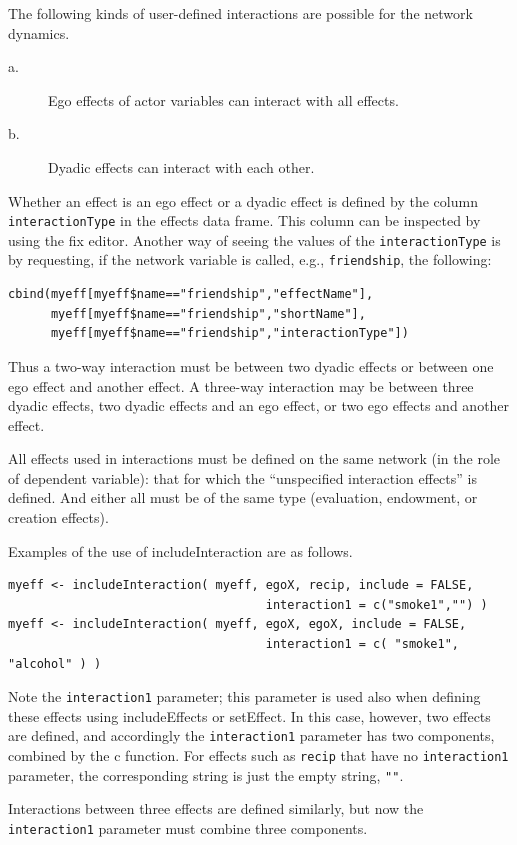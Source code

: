 \documentclass[a4paper,fleqn,11pt]{article}
\newcommand{\+}{\, + \,}
\newcommand{\sfn}[1]{\textsf{#1}}
\begin{document}
{The following kinds of user-defined interactions are possible
for the network dynamics.
\begin{description}
\item[a.]
  Ego effects of actor variables can interact with all effects.
  \item[b.] Dyadic effects can interact with each other.
\end{description}
Whether an effect is an ego effect or a dyadic effect is defined by
the column \texttt{interactionType} in the effects data frame.
This column can be inspected by using the \sfn{fix} editor.
Another way of seeing
the values of the \texttt{interactionType} is by requesting,
if the network variable is called, e.g., \texttt{friendship}, the following:
\begin{verbatim}
cbind(myeff[myeff$name=="friendship","effectName"],
      myeff[myeff$name=="friendship","shortName"],
      myeff[myeff$name=="friendship","interactionType"])
\end{verbatim}
Thus a two-way interaction must be between two dyadic effects or between one
ego effect and another effect. A three-way interaction may be between three
dyadic effects, two dyadic effects and an ego effect, or two ego effects and
another effect.

All effects used in interactions must be defined on the same network
(in the role of dependent variable): that for
which the ``unspecified
interaction effects'' is defined.  And either all must be
of the same type (evaluation, endowment, or creation effects).

Examples of the use of \sfn{includeInteraction} are as follows.
\begin{verbatim}
myeff <- includeInteraction( myeff, egoX, recip, include = FALSE,
                                    interaction1 = c("smoke1","") )
myeff <- includeInteraction( myeff, egoX, egoX, include = FALSE,
                                    interaction1 = c( "smoke1", "alcohol" ) )
\end{verbatim}
Note the \texttt{interaction1} parameter; this parameter is used also
when defining these effects using \sfn{includeEffects} or
\sfn{setEffect}. In this case, however, two effects are defined,
and accordingly the \texttt{interaction1} parameter has two components,
combined by the \sfn{c} function.
For effects such as \texttt{recip} that have no \texttt{interaction1}
parameter, the corresponding string is just the empty string, \texttt{""}.

Interactions between three effects are defined similarly,
but now the \texttt{interaction1} parameter must combine three components.


}
\end{document}
